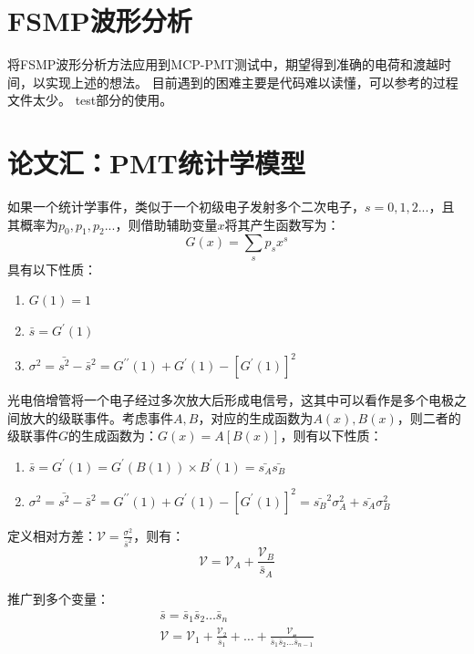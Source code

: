 \documentclass[a4paper]{article}
\begin{document}
\section{FSMP波形分析}
将FSMP波形分析方法应用到MCP-PMT测试中，期望得到准确的电荷和渡越时间，以实现上述的想法。
目前遇到的困难主要是代码难以读懂，可以参考的过程文件太少。
test部分的使用。

\newpage

\section{论文汇：PMT统计学模型}
如果一个统计学事件，类似于一个初级电子发射多个二次电子，$s=0,1,2...$，且其概率为$p_0,p_1,p_2...$，则借助辅助变量$x$将其产生函数写为：
\begin{equation}
    G(x)=\sum_s p_s x^s
\end{equation}
具有以下性质：
\begin{enumerate}
    \item {$G(1)=1$}
    \item {$\bar{s}=G^{\prime}(1)$}
    \item {$\sigma^2=\bar{s^2}-\bar{s}^2=G^{\prime\prime}(1)+G^{\prime}(1)-[G^{\prime}(1)]^2$}
\end{enumerate}
光电倍增管将一个电子经过多次放大后形成电信号，这其中可以看作是多个电极之间放大的级联事件。考虑事件$A,B$，对应的生成函数为$A(x),B(x)$，则二者的级联事件$G$的生成函数为：$G(x)=A[B(x)]$，则有以下性质：
\begin{enumerate}
    \item {$\bar{s}=G^{\prime}(1)=G^{\prime}(B(1))\times B^{\prime}(1)=\bar{s_A}\bar{s_B}$}
    \item {$\sigma^2=\bar{s^2}-\bar{s}^2=G^{\prime\prime}(1)+G^{\prime}(1)-[G^{\prime}(1)]^2=\bar{s_B}^2\sigma_A^2+\bar{s_A}\sigma_B^2$}
\end{enumerate}

定义相对方差：$\mathscr{V}= \frac{\sigma^2}{\bar{s}^2}$，则有：
\begin{equation}
    \mathscr{V}=\mathscr{V}_A+\frac{\mathscr{V}_B}{\bar{s}_A}
\end{equation}

推广到多个变量：
\begin{equation}
    \begin{gathered}
        \bar{s}=\bar{s}_1 \bar{s}_2 \ldots \bar{s}_n \\
        \mathscr{V}=\mathscr{V}{ }_1+\frac{\mathscr{V}_2}{\bar{s}_1}+\ldots+\frac{\mathscr{V_{ n }}}{\bar{s}_1 \bar{s}_2 \ldots \bar{s}_{n-1}}
    \end{gathered}
\end{equation}
\end{document}
